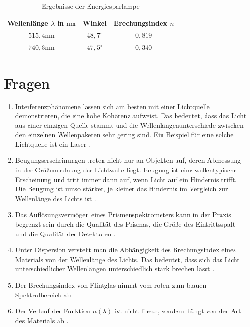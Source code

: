 \documentclass[11pt, a4paper]{article}
\begin{document}

    \begin{table}[h]
        \centering
        \begin{tabular}{c|c|c}
            Wellenlänge $\lambda$ in $\si{\nano\metre}$ & Winkel & Brechungsindex $n$ \\ \hline
            $515,4 \si{\nano\meter}$ & $48,7^{\circ}$ & $0,819$ \\ \hline
            $740,8 \si{\nano\meter}$ & $47,5^{\circ}$ & $0,340$ \\ \hline
        \end{tabular}
        \caption{Ergebnisse der Energiesparlampe}
        \label{tab:energiesparlampe}
    \end{table}

    \section{Fragen} %

    \begin{enumerate} 
        \item Interferenzphänomene lassen sich am besten mit einer Lichtquelle demonstrieren, die eine hohe Kohärenz aufweist. Das bedeutet, dass das Licht aus einer einzigen Quelle stammt und die Wellenlängenunterschiede zwischen den einzelnen Wellenpaketen sehr gering sind. Ein Beispiel für eine solche Lichtquelle ist ein Laser \cite{interference}. 
        \item Beugungserscheinungen treten nicht nur an Objekten auf, deren Abmessung in der Größenordnung der Lichtwelle liegt. Beugung ist eine wellentypische Erscheinung und tritt immer dann auf, wenn Licht auf ein Hindernis trifft. Die Beugung ist umso stärker, je kleiner das Hindernis im Vergleich zur Wellenlänge des Lichts ist \cite{diffraction}. 
        \item Das Auflösungsvermögen eines Prismenspektrometers kann in der Praxis begrenzt sein durch die Qualität des Prismas, die Größe des Eintrittsspalt und die Qualität der Detektoren \cite{prism}. 
        \item Unter Dispersion versteht man die Abhängigkeit des Brechungsindex eines Materials von der Wellenlänge des Lichts. Das bedeutet, dass sich das Licht unterschiedlicher Wellenlängen unterschiedlich stark brechen lässt \cite{dispersion}. 
        \item Der Brechungsindex von Flintglas nimmt vom roten zum blauen Spektralbereich ab \cite{dispersion}. 
        \item Der Verlauf der Funktion $n(\lambda)$ ist nicht linear, sondern hängt von der Art des Materials ab \cite{prism}. \end{enumerate}

    
    
\end{document}
